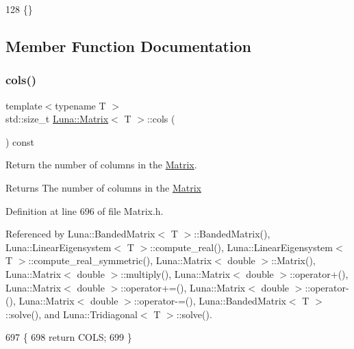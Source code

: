 \begin{DoxyCode}
128 \{\}
\end{DoxyCode}


\subsection{Member Function Documentation}
\mbox{\label{classLuna_1_1Matrix_aa7472f90f4c470535e722f3a389a19b1}} 
\subsubsection{\texorpdfstring{cols()}{cols()}}
{\footnotesize\ttfamily template$<$typename T $>$ \\
std\+::size\+\_\+t \hyperlink{classLuna_1_1Matrix}{Luna\+::\+Matrix}$<$ T $>$\+::cols (\begin{DoxyParamCaption}{ }\end{DoxyParamCaption}) const\hspace{0.3cm}{\ttfamily [inline]}}



Return the number of columns in the \hyperlink{classLuna_1_1Matrix}{Matrix}. 

\begin{DoxyReturn}{Returns}
The number of columns in the \hyperlink{classLuna_1_1Matrix}{Matrix} 
\end{DoxyReturn}


Definition at line 696 of file Matrix.\+h.



Referenced by Luna\+::\+Banded\+Matrix$<$ T $>$\+::\+Banded\+Matrix(), Luna\+::\+Linear\+Eigensystem$<$ T $>$\+::compute\+\_\+real(), Luna\+::\+Linear\+Eigensystem$<$ T $>$\+::compute\+\_\+real\+\_\+symmetric(), Luna\+::\+Matrix$<$ double $>$\+::\+Matrix(), Luna\+::\+Matrix$<$ double $>$\+::multiply(), Luna\+::\+Matrix$<$ double $>$\+::operator+(), Luna\+::\+Matrix$<$ double $>$\+::operator+=(), Luna\+::\+Matrix$<$ double $>$\+::operator-\/(), Luna\+::\+Matrix$<$ double $>$\+::operator-\/=(), Luna\+::\+Banded\+Matrix$<$ T $>$\+::solve(), and Luna\+::\+Tridiagonal$<$ T $>$\+::solve().


\begin{DoxyCode}
697   \{
698     \textcolor{keywordflow}{return} COLS;
699   \}
\end{DoxyCode}
\mbox{\label{classLuna_1_1Matrix_a29b73b01b1851be977115fc3008aaf64}} 
